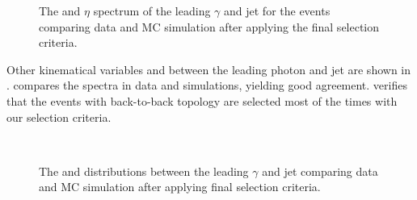\begin{figure}[h!]
 \caption{ The \pt and $\eta$ spectrum of the leading $\gamma$ and jet for the events comparing data and MC simulation after applying the final selection criteria.}
\label{fig:PtEta}
\end{figure}

Other kinematical variables \deta and \dphi between the leading photon and jet are shown in \fig{\ref{fig:DEtaPhi}}. \Fig{\ref{fig:dEta}} compares 
the  spectra in data and simulations, yielding good agreement. \Fig{\ref{fig:dPhi}} verifies that the events
with back-to-back topology are selected most of the times with our selection criteria.%
\begin{figure}[h!]
\centering
   \\
 \caption{ The  and  distributions between the leading $\gamma$ and jet comparing data  and MC simulation after applying final selection criteria.}
\label{fig:DEtaPhi}
\end{figure}


